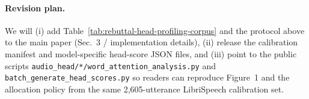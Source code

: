 \paragraph{Revision plan.}
We will (i) add Table~\ref{tab:rebuttal-head-profiling-corpus} and the protocol above to the main paper (Sec.~3 / implementation details), (ii) release the calibration manifest and model-specific head-score JSON files, and (iii) point to the public scripts \texttt{audio\_head/*/word\_attention\_analysis.py} and \texttt{batch\_generate\_head\_scores.py} so readers can reproduce Figure~1 and the allocation policy from the same 2{,}605-utterance LibriSpeech calibration set.
